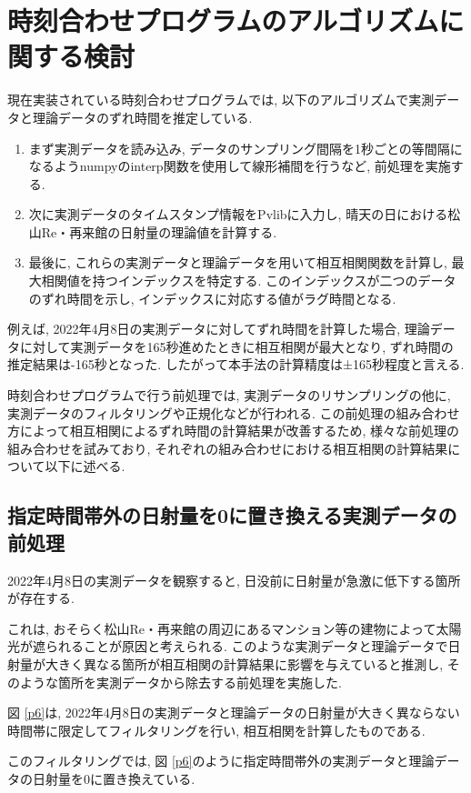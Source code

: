 \documentclass[a4j,12pt,]{jarticle}
\begin{document}
\section{時刻合わせプログラムのアルゴリズムに関する検討}
現在実装されている時刻合わせプログラムでは, 以下のアルゴリズムで実測データと理論データのずれ時間を推定している.

\begin{enumerate}
  \item まず実測データを読み込み, データのサンプリング間隔を1秒ごとの等間隔になるようnumpyのinterp関数を使用して線形補間を行うなど, 前処理を実施する.
  \item 次に実測データのタイムスタンプ情報をPvlibに入力し, 晴天の日における松山Re・再来館の日射量の理論値を計算する.
  \item 最後に, これらの実測データと理論データを用いて相互相関関数を計算し, 最大相関値を持つインデックスを特定する. このインデックスが二つのデータのずれ時間を示し, インデックスに対応する値がラグ時間となる.
\end{enumerate}

例えば, 2022年4月8日の実測データに対してずれ時間を計算した場合, 理論データに対して実測データを165秒進めたときに相互相関が最大となり, ずれ時間の推定結果は-165秒となった. したがって本手法の計算精度は±165秒程度と言える.

時刻合わせプログラムで行う前処理では, 実測データのリサンプリングの他に, 実測データのフィルタリングや正規化などが行われる. この前処理の組み合わせ方によって相互相関によるずれ時間の計算結果が改善するため, 様々な前処理の組み合わせを試みており, それぞれの組み合わせにおける相互相関の計算結果について以下に述べる.

\subsection{指定時間帯外の日射量を0に置き換える実測データの前処理}
2022年4月8日の実測データを観察すると, 日没前に日射量が急激に低下する箇所が存在する.

これは, おそらく松山Re・再来館の周辺にあるマンション等の建物によって太陽光が遮られることが原因と考えられる. このような実測データと理論データで日射量が大きく異なる箇所が相互相関の計算結果に影響を与えていると推測し, そのような箇所を実測データから除去する前処理を実施した.

図 \ref{p6}は, 2022年4月8日の実測データと理論データの日射量が大きく異ならない時間帯に限定してフィルタリングを行い, 相互相関を計算したものである.

このフィルタリングでは, 図 \ref{p6}のように指定時間帯外の実測データと理論データの日射量を0に置き換えている.
\end{document}
